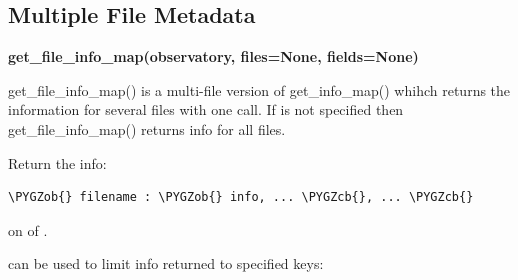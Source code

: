 \documentclass[letterpaper,10pt,english]{sphinxmanual}
\def\PYGZob{\char`\{}
\def\PYGZcb{\char`\}}
\begin{document}
\subsection{Multiple File Metadata}
\label{web_services:multiple-file-metadata}
\textbf{get\_file\_info\_map(observatory, files=None, fields=None)}

get\_file\_info\_map() is a multi-file version of get\_info\_map() whihch returns
the information for several files with one call.  If  is not specified
then get\_file\_info\_map() returns info for all files.

Return the info:

\begin{Verbatim}[commandchars=\\\{\}]
\PYGZob{} filename : \PYGZob{} info, ... \PYGZcb{}, ... \PYGZcb{}
\end{Verbatim}

on  of .

 can be used to limit info returned to specified keys:
\end{document}
